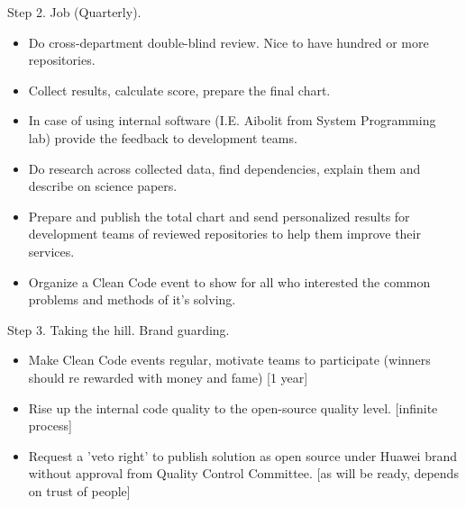 \documentclass[12pt,oneside]{article}
\begin{document}
Step 2. Job (Quarterly).
\begin{itemize}
\item Do cross-department double-blind review. Nice to have hundred or more repositories.
\item Collect results, calculate score, prepare the final chart.
\item In case of using internal software (I.E. Aibolit from System Programming lab) provide the feedback to development teams.
\item Do research across collected data, find dependencies, explain them and describe on science papers.
\item Prepare and publish the total chart and send personalized results for development teams of reviewed repositories to help them improve their services.
\item Organize a Clean Code event to show for all who interested the common problems and methods of it's solving.
\end{itemize}

Step 3. Taking the hill. Brand guarding.
\begin{itemize}
\item Make Clean Code events regular, motivate teams to participate (winners should re rewarded with money and fame) [1 year]
\item Rise up the internal code quality to the open-source quality level. [infinite process]
\item Request a 'veto right' to publish solution as open source under Huawei brand without approval from Quality Control Committee. [as will be ready, depends on trust of people]
\end{itemize}

\raggedright
\end{document}
